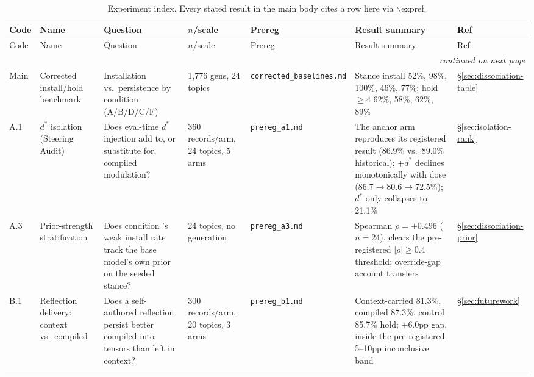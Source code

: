 \begingroup
\small
\setlength{\tabcolsep}{3pt}
\begin{longtable}{@{}p{}p{}p{}p{}p{}p{}p{}@{}}
\caption{Experiment index. Every stated result in the main body cites a row here via
\(\backslash\)expref{}.}
\label{tab:expindex}\\
\toprule
Code & Name & Question & \(n\)/scale & Prereg & Result summary & Ref \\
\midrule
\endfirsthead
\toprule
Code & Name & Question & \(n\)/scale & Prereg & Result summary & Ref \\
\midrule
\endhead
\midrule
\multicolumn{7}{r}{\textit{continued on next page}} \\
\endfoot
\bottomrule
\endlastfoot

\label{app:exp-main}Main &
Corrected install/hold benchmark &
Installation vs.\ persistence by condition (A/B/D/C/F) &
1{,}776 gens, 24 topics &
\texttt{corrected\_\allowbreak baselines.md} &
Stance install \condA{} 52\%, \condB{} 98\%, \condD{} 100\%, \condC{} 46\%, \condF{}
77\%; hold \(\ge\)4 \condA{} 62\%, \condB{} 58\%, \condD{} 62\%, \condF{} 89\% &
\S\ref{sec:dissociation-table} \\
\addlinespace

\label{app:exp-a1}A.1 &
\(d^*\) isolation (Steering Audit) &
Does eval-time \(d^*\) injection add to, or substitute for, compiled modulation? &
360 records/arm, 24 topics, 5 arms &
\texttt{prereg\_a1.md} &
The \condF{} anchor arm reproduces its registered result (86.9\% vs.\ 89.0\% historical); \condF{}+\(d^*\) declines
monotonically with dose (86.7\(\to\)80.6\(\to\)72.5\%); \(d^*\)-only collapses to 21.1\% &
\S\ref{sec:isolation-rank} \\
\addlinespace

\label{app:exp-a3}A.3 &
Prior-strength stratification &
Does condition \condC{}'s weak install rate track the base model's own prior on the
seeded stance? &
24 topics, no generation &
\texttt{prereg\_a3.md} &
Spearman \(\rho = +0.496\) (\(n=24\)), clears the pre-registered \(|\rho|\ge0.4\)
threshold; override-gap account transfers &
\S\ref{sec:dissociation-prior} \\
\addlinespace

\label{app:exp-b1}B.1 &
Reflection delivery: context vs.\ compiled &
Does a self-authored reflection persist better compiled into tensors than left in
context? &
300 records/arm, 20 topics, 3 arms &
\texttt{prereg\_b1.md} &
Context-carried 81.3\%, compiled 87.3\%, control 85.7\% hold; \(+6.0\)pp gap, inside the
pre-registered 5--10pp inconclusive band &
\S\ref{sec:futurework} \\
\addlinespace


\end{longtable}
